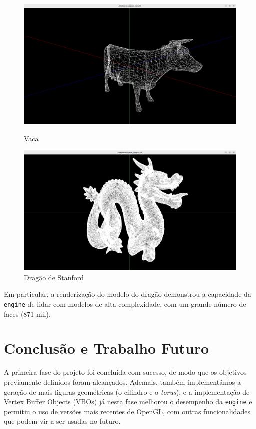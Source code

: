 \documentclass[12pt, a4paper]{article}
\begin{document}
\begin{figure}[H]
    \centering
    \begin{minipage}{0.48\textwidth}
        \centering
        \includegraphics[width=\textwidth]{res/results/Cow.png}
        \caption{Vaca}
    \end{minipage}\hfill
    \begin{minipage}{0.48\textwidth}
        \centering
        \includegraphics[width=\textwidth]{res/results/Dragon.png}
        \caption{Dragão de Stanford}
    \end{minipage}
\end{figure}

Em particular, a renderização do modelo do dragão demonstrou a capacidade da \texttt{engine} de
lidar com modelos de alta complexidade, com um grande número de faces (871 mil).

\section{Conclusão e Trabalho Futuro}

A primeira fase do projeto foi concluída com sucesso, de modo que os objetivos previamente definidos
foram alcançados. Ademais, também implementámos a geração de mais figuras geométricas (o cilindro e
o \emph{torus}), e a implementação de Vertex Buffer Objects (VBOs) já nesta fase melhorou o
desempenho da \texttt{engine} e permitiu o uso de versões mais recentes de OpenGL, com outras
funcionalidades que podem vir a ser usadas no futuro.
\end{document}
